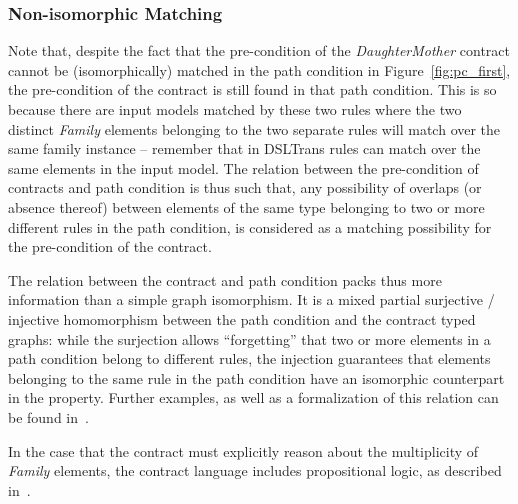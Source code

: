 \subsubsection{Non-isomorphic Matching}
Note that, despite the fact that the pre-condition of the
\textit{Daughter\-Mother} contract cannot be (isomorphically) matched in the path
condition in Figure~\ref{fig:pc_first}, the pre-condition of the contract is still
found in that path condition. This is so because there are input models
matched by these two rules where the two distinct \textit{Family} elements
belonging to the two separate rules will match over the same family instance --
remember that in DSLTrans rules can match over the same elements in the input
model. The relation between the pre-condition of contracts and path condition is
thus such that, any possibility of overlaps (or absence thereof) between
elements of the same type belonging to two or more different rules in the path condition,
is considered as a matching possibility for the pre-condition of the
contract.

The relation between the contract and path condition packs thus more
information than a simple graph isomorphism. It is a mixed partial surjective /
injective homomorphism between the path condition and the contract typed graphs:
while the surjection allows ``forgetting'' that two or more elements in a path condition belong to
different rules, the injection guarantees that elements belonging to the
same rule in the path condition have an isomorphic counterpart in the property.
Further examples, as well as a formalization of this relation can be found in~\cite{Lucio2014}.

 In the case that the contract must explicitly reason about the multiplicity of \textit{Family} elements, the contract language includes
 propositional logic, as described in~\cite{Oakes2016}.





 
